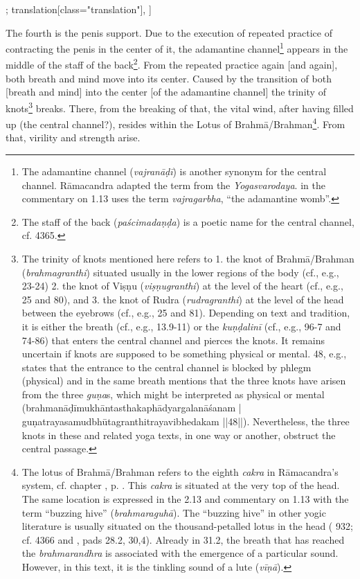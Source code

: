 \begin{alignment}[
  texts=edition[class="edition"];
  translation[class="translation"],
  ]
\begin{translation}
    \begin{tlate}
      \noindent
      The fourth is the penis support. Due to the execution of repeated practice of contracting the penis in the center of it, the adamantine channel\footnote{The adamantine channel (\textit{vajranāḍī}) is another synonym for the central channel. Rāmacandra adapted the term from the \textit{Yogasvarodaya}.  in the commentary on 1.13 uses the term \textit{vajragarbha}, ``the adamantine womb''.} appears in the middle of the staff of the back\footnote{The staff of the back (\textit{paścimadaṇḍa}) is a poetic name for the central channel, cf.  4365.}. From the repeated practice again [and again], both breath and mind move into its center. Caused by the transition of both [breath and mind] into the center [of the adamantine channel] the trinity of knots\footnote{The trinity of knots mentioned here refers to 1. the knot of Brahmā/Brahman (\textit{brahmagranthi}) situated usually in the lower regions of the body (cf., e.g.,  23-24) 2. the knot of Viṣṇu (\textit{viṣṇugranthi}) at the level of the heart (cf., e.g.,  25 and  80), and 3. the knot of Rudra (\textit{rudragranthi}) at the level of the head between the eyebrows (cf., e.g.,  25 and  81). Depending on text and tradition, it is either the breath (cf., e.g.,  13.9-11) or the \textit{kuṇḍalinī} (cf., e.g.,  96-7 and  74-86) that enters the central channel and pierces the knots. It remains uncertain if knots are supposed to be something physical or mental.  48, e.g., states that the entrance to the central channel is blocked by phlegm (physical) and in the same breath mentions that the three knots have arisen from the three \textit{guṇa}s, which might be interpreted as physical or mental (brahmanāḍīmukhāntasthakaphādyargalanāśanam | guṇatrayasamudbhūtagranthitrayavibhedakam ||48||). Nevertheless, the three knots in these and related yoga texts, in one way or another, obstruct the central passage.} breaks. There, from the breaking of that, the vital wind, after having filled up (the central channel?), resides within the Lotus of Brahmā/Brahman\footnote{The lotus of Brahmā/Brahman refers to the eighth \textit{cakra} in Rāmacandra's system, cf. chapter , p. \pageref{cakra8}. This \textit{cakra} is situated at the very top of the head. The same location is expressed in the  2.13 and  commentary on 1.13 with the term ``buzzing hive'' (\textit{brahmaraguhā}). The ``buzzing hive'' in other yogic literature is usually situated on the thousand-petalled lotus in the head ( 932; cf.  4366 and , pads 28.2, 30,4). Already in  31.2, the breath that has reached the \textit{brahmarandhra} is associated with the emergence of a particular sound. However, in this text, it is the tinkling sound of a lute (\textit{vīṇā}).}. From that, virility and strength arise. 
\end{tlate}
\end{translation}
\end{alignment}
